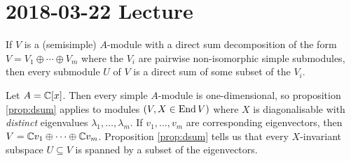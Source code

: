 \section{2018-03-22 Lecture}

\begin{prop}\label{prop:dsum}
	If $V$ is a (semisimple) $A$-module with a direct sum decomposition of the form $V = V_1 \oplus \cdots \oplus V_m$ where the $V_i$ are pairwise non-isomorphic simple submodules, then every submodule $U$ of $V$ is a direct sum of some subset of the $V_i$.
\end{prop}

\begin{cor}
	Let $A = \mathbb{C}[x]$.
	Then every simple $A$-module is one-dimensional, so proposition \ref{prop:dsum} applies to modules $(V,X \in \operatorname{End} V)$ where $X$ is diagonalisable with \emph{distinct} eigenvalues $\lambda_1,\ldots,\lambda_m$.
	If $v_1,\ldots,v_m$ are corresponding eigenvectors, then $V = \mathbb{C} v_1 \oplus \cdots \oplus \mathbb{C} v_m$.
	Proposition \ref{prop:dsum} tells us that every $X$-invariant subspace $U \subseteq V$ is spanned by a subset of the eigenvectors.
\end{cor}

